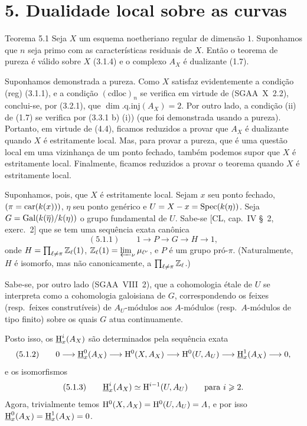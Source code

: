 \section*{5. Dualidade local sobre as curvas}

\begin{statement}{Teorema 5.1}
Seja $X$ um esquema noetheriano regular de dimensão $1$. Suponhamos que $n$ seja primo com as características residuais de $X$. Então o teorema de pureza é válido sobre $X$ (3.1.4) e o complexo $A_X$ é dualizante (1.7).
\end{statement}

\begin{prooftext}[Demonstração]
Suponhamos demonstrada a pureza. Como $X$ satisfaz evidentemente a condição (reg) (3.1.1), e a condição $(\mathrm{cdloc})_n$ se verifica em virtude de (SGAA~X~2.2), conclui-se, por (3.2.1), que $\dim.\mathrm{q.inj}(A_X)=2$. Por outro lado, a condição (ii) de (1.7) se verifica por (3.3.1 b) (i)) (que foi demonstrada usando a pureza). Portanto, em virtude de (4.4), ficamos reduzidos a provar que $A_X$ é dualizante quando $X$ é estritamente local. Mas, para provar a pureza, que é uma questão local em uma vizinhança de um ponto fechado, também podemos supor que $X$ é estritamente local. Finalmente, ficamos reduzidos a provar o teorema quando $X$ é estritamente local.

Suponhamos, pois, que $X$ é estritamente local. Sejam $x$ seu ponto fechado, $(\pi=\operatorname{car}(k(x)))$, $\eta$ seu ponto genérico e $U=X-x=\operatorname{Spec}(k(\eta))$. Seja $G=\operatorname{Gal}(k(\overline{\eta})/k(\eta))$ o grupo fundamental de $U$. Sabe-se [CL, cap.~IV \S~2, exerc.~2] que se tem uma sequência exata canônica
\[
(5.1.1)\qquad 1\longrightarrow P\longrightarrow G\longrightarrow H\longrightarrow1,
\]
onde $H=\prod_{\ell\ne\pi}\mathbb{Z}_\ell(1)$, $\mathbb{Z}_\ell(1)=\varprojlim_{\nu} \mu_{\ell^\nu}$, e $P$ é um grupo pró-$\pi$. (Naturalmente, $H$ é isomorfo, mas não canonicamente, a $\prod_{\ell\ne\pi}\mathbb{Z}_\ell$.)

Sabe-se, por outro lado (SGAA~VIII~2), que a cohomologia étale de $U$ se interpreta como a cohomologia galoisiana de $G$, correspondendo os feixes (resp.~feixes construtíveis) de $A_U$-módulos aos $A$-módulos (resp.~$A$-módulos de tipo finito) sobre os quais $G$ atua continuamente.

Posto isso, os $\underline{\mathrm H}_x^i(A_X)$ são determinados pela sequência exata
\[
(5.1.2)\qquad 0\longrightarrow \underline{\mathrm H}_x^0(A_X)\longrightarrow \mathrm{H}^0(X,A_X)\longrightarrow \mathrm{H}^0(U,A_U)\longrightarrow \underline{\mathrm H}_x^1(A_X)\longrightarrow0,
\]
e os isomorfismos
\[
(5.1.3)\qquad \underline{\mathrm H}_x^i(A_X)\simeq \mathrm{H}^{i-1}(U,A_U)\qquad\text{para }i\geqslant2.
\]
Agora, trivialmente temos $\mathrm{H}^0(X,A_X)=\mathrm{H}^0(U,A_U)=A$, e por isso $\underline{\mathrm H}_x^0(A_X)=\underline{\mathrm H}_x^1(A_X)=0$.


\end{prooftext}
